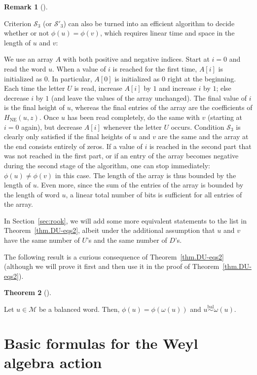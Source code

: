 \documentclass[numbers=enddot,12pt,final,onecolumn,notitlepage]{scrartcl}%
\theoremstyle{definition}
\newtheorem{theo}{Theorem}[section]
\newenvironment{theorem}[1][]
{\begin{theo}[#1]\begin{leftbar}}
{\end{leftbar}\end{theo}}
\newtheorem{remk}[theo]{Remark}
\newenvironment{remark}[1][]
{\begin{remk}[#1]\begin{leftbar}}
{\end{leftbar}\end{remk}}
\newcommand{\M}{\mathcal{M}}
\newcommand{\NE}{\operatorname{NE}}
\newcommand{\balsim}{\overset{\operatorname*{bal}}{\sim}}
\newcommand{\tup}[1]{\left( #1 \right)}
\begin{document}
\begin{remark}
\label{rmk.algorithm}
Criterion $\mathcal{S}_3$ (or $\mathcal{S}'_3$) can also be turned into an efficient algorithm to decide whether or not $\phi\tup{u} = \phi\tup{v}$, which requires linear time and space in the length of $u$ and $v$: 

We use an array $A$ with both positive and negative indices. 
Start at $i=0$ and read the word $u$. When a value of $i$ is reached for the first time, $A[i]$ is initialized as $0$. In particular, $A[0]$ is initialized as $0$ right at the beginning. 
Each time the letter $U$ is read, increase $A[i]$ by $1$ and increase $i$ by $1$; else decrease $i$ by $1$ (and leave the values of the array unchanged). The final value of $i$ is the final height of $u$, whereas the final entries of the array are the coefficients of $H_{\NE}\tup{u, z}$. 
Once $u$ has been read completely, do the same with $v$ (starting at $i=0$ again), but decrease $A[i]$ whenever the letter $U$ occurs. Condition $\mathcal{S}_3$ is clearly only satisfied if the final heights of $u$ and $v$ are the same and the array at the end consists entirely of zeros. If a value of $i$ is reached in the second part that was not reached in the first part, or if an entry of the array becomes negative during the second stage of the algorithm, one can stop immediately: $\phi\tup{u} \neq \phi\tup{v}$ in this case.
The length of the array is thus bounded by the length of $u$. Even more, since the sum of the entries of the array is bounded by the length of word $u$, a linear total number of bits is sufficient for all entries of the array.
\end{remark}

In Section~\ref{sec:rook}, we will add some more equivalent statements to the list in Theorem~\ref{thm.DU-eqs2}, albeit under the additional assumption that $u$ and $v$ have the same number of $U$'s and the same number of $D$'s.

The following result is a curious consequence of Theorem~\ref{thm.DU-eqs2} (although we will prove it first and then use it in the proof of Theorem~\ref{thm.DU-eqs2}).

\begin{theorem}
\label{thm.phiomega}
Let $u \in \M$ be a balanced word. Then,
$\phi\tup{u} = \phi\tup{\omega\tup{u}}$ and
$u \balsim \omega\tup{u}$.
\end{theorem}


\section{Basic formulas for the Weyl algebra action}\label{sec:basicform}
\end{document}
